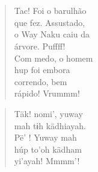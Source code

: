 \chapter*{}

\mbox{}\vspace*{\fill}

\begin{verse}
Tac! Foi o barulhão\\
que fez. Assustado,\\
o Way Naku caiu da\\
árvore. Puffff!\\
Com medo, o homem\\
hup foi embora\\
correndo, bem\\
rápido! Vrummm!
\end{verse}

\begin{verse}
Täk! nomi’, yuway\\
mah tɨh kädhiayah.\\
Pë’ ! Yuway mah\\
húp to’oh kädham\\
yi’ayah! Mmmm’!
\end{verse}

\vspace*{\fill}

